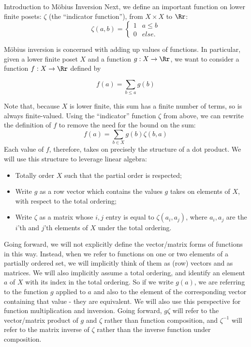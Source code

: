 \documentclass[12pt]{pom_thesis}
\begin{document}
\begin{chapter}{Introduction to M\"obius Inversion}
Next, we define an important function on lower finite posets: $\zeta$ (the ``indicator function''), from $X \times X$ to $\Rr$:
\[
\zeta(a,b) = \begin{cases} 1 & a \leq b \\ 0 & else. \end{cases}
\]

M\"obius inversion is concerned with adding up values of functions. In particular, given a lower finite poset $X$ and a function $g:X \rightarrow \Rr$, we want to consider a function $f:X \rightarrow \Rr$ defined by

\[
f(a) = \sum_{b \leq a}g(b)
\]

Note that, because $X$ is lower finite, this sum has a finite number of terms, so is always finite-valued. Using the ``indicator'' function $\zeta$ from above, we can rewrite the definition of $f$ to remove the need for the bound on the sum:
\begin{equation}\label{sum_form_intro}
f(a) = \sum_{b \in X}g(b)\zeta(b,a)
\end{equation}
Each value of $f$, therefore, takes on precisely the structure of a dot product. We will use this structure to leverage linear algebra: 
\begin{itemize}
\item Totally order $X$ such that the partial order is respected;
\item Write $g$ as a row vector which contains the values $g$ takes on elements of $X$, with respect to the total ordering;
\item Write $\zeta$ as a matrix whose $i,j$ entry is equal to $\zeta(a_i, a_j)$, where $a_i, a_j$ are the $i$'th and $j$'th elements of $X$ under the total ordering.
\end{itemize}

Going forward, we will not explicitly define the vector/matrix forms of functions in this way. Instead, when we refer to functions on one or two elements of a partially ordered set, we will implicitly think of them as (row) vectors and as matrices. We will also implicitly assume a total ordering, and identify an element $a$ of $X$ with its index in the total ordering. So if we write $g(a)$, we are referring to the function $g$ applied to $a$ and also to the element of the corresponding vector containing that value - they are equivalent. We will also use this perspective for function multiplication and inversion. Going forward, $g\zeta$ will refer to the vector/matrix product of $g$ and $\zeta$ rather than function composition, and $\zeta^{-1}$ will refer to the matrix inverse of $\zeta$ rather than the inverse function under composition.


\end{chapter}
\end{document}
